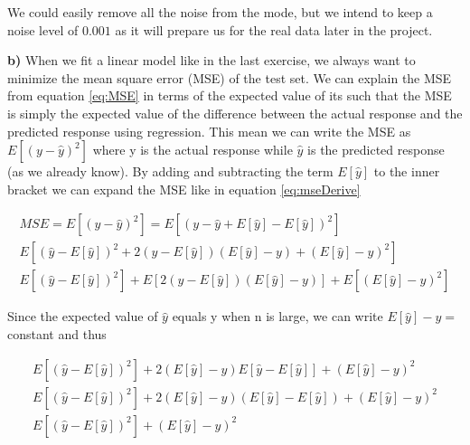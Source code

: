 \documentclass[12pt,a4paper]{article}
\begin{document}
\noindent We could easily remove all the noise from the mode, but we intend to keep a noise level of $0.001$ as it will prepare us for the real data later in the project.

\newpage

\noindent \textbf{b)} When we fit a linear model like in the last exercise, we always want to minimize the mean square error (MSE) of the test set. We can explain the MSE from equation \ref{eq:MSE} in terms of the expected value of its such that the MSE is simply the expected value of the difference between the actual response and the predicted response using regression. This mean we can write the MSE as $E[(y-\hat{y})^2]$ where y is the actual response while $\hat{y}$ is the predicted response (as we already know). By adding and subtracting the term $E[\hat{y}]$ to the inner bracket we can expand the MSE like in equation \ref{eq:mseDerive}

\begin{equation}\label{eq:mseDerive}
\begin{aligned}
MSE = E[(y-\hat{y})^2] = E[(y-\hat{y} + E[\hat{y}] - E[\hat{y}])^2]
\\
E[(\hat{y} - E[\hat{y}])^2 + 2(\hat{y} - E[\hat{y}])(E[\hat{y}]-y) + (E[\hat{y}]-y)^2]
\\
E[(\hat{y} - E[\hat{y}])^2] + E[2(\hat{y} - E[\hat{y}])(E[\hat{y}]-y)] + E[(E[\hat{y}]-y)^2]
\end{aligned}
\end{equation}

\noindent Since the expected value of $\hat{y}$ equals y when n is large, we can write $E[\hat{y}] - y =$ constant and thus

\begin{equation}\label{eq:mseDerive2}
\begin{aligned}
E[(\hat{y} - E[\hat{y}])^2] + 2(E[\hat{y}]-y)E[\hat{y}-E[\hat{y}]] + (E[\hat{y}]-y)^2
\\
E[(\hat{y} - E[\hat{y}])^2] + 2(E[\hat{y}]-y)(E[\hat{y}] - E[\hat{y}])+ (E[\hat{y}]-y)^2
\\
E[(\hat{y} - E[\hat{y}])^2] + (E[\hat{y}]-y)^2
\end{aligned}
\end{equation}
\end{document}
